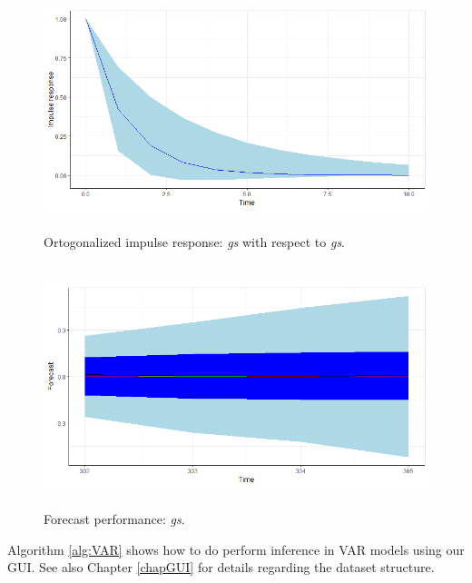\begin{figure}[!h]
	\includegraphics[width=340pt, height=200pt]{Chapters/chapter8/figures/IRsgsgO.png}
	\caption[List of figure caption goes here]{Ortogonalized impulse response: \textit{gs} with respect to \textit{gs}.}\label{fig7}
\end{figure}

\begin{figure}[!h]
	\includegraphics[width=340pt, height=200pt]{Chapters/chapter8/figures/Forecastgs.png}
	\caption[List of figure caption goes here]{Forecast performance: \textit{gs}.}\label{fig8}
\end{figure}

Algorithm \ref{alg:VAR} shows how to do perform inference in VAR models using our GUI. See also Chapter \ref{chapGUI} for details regarding the dataset structure. 

